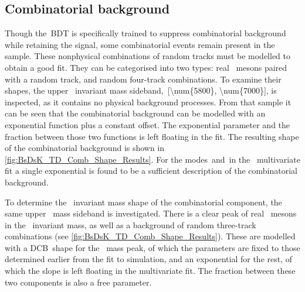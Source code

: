 \subsection{Combinatorial background}

Though the~BDT is specifically trained to suppress combinatorial background while retaining the signal, some combinatorial events remain present in the sample.
These nonphysical combinations of random tracks must be modelled to obtain a good fit.
They can be categorised into two types: real \Dsm~mesons paired with a random track, and random four-track combinations.
To examine their shapes, the upper \Bs~invariant mass sideband,~\SI[parse-numbers=false]{[\num{5800}, \num{7000}]}{\MeVcc}, is inspected, as it contains no physical background processes.
From that sample it can be seen that the combinatorial background can be modelled with an exponential function plus a constant offset.
The exponential parameter and the fraction between those two functions is left floating in the fit.
The resulting shape of the combinatorial background is shown in \cref{fig:BsDsK_TD_Comb_Shape_Results}.
For the modes~\DsmKPiPi and~\DsmPiPiPi in the \BsDsK~multivariate fit a single exponential is found to be a sufficient description of the combinatorial background.

To determine the \Dsm~invariant mass shape of the combinatorial component, the same upper \Bs~mass sideband is investigated.
There is a clear peak of real \Dsm~mesons in the \Dsm~invariant mass, as well as a background of random three-track combinations (see \cref{fig:BsDsK_TD_Comb_Shape_Results}).
These are modelled with a DCB~shape for the \Dsm~mass peak, of which the parameters are fixed to those determined earlier from the fit to simulation, and an exponential for the rest, of which the slope is left floating in the multivariate fit.
The fraction between these two components is also a free parameter.

